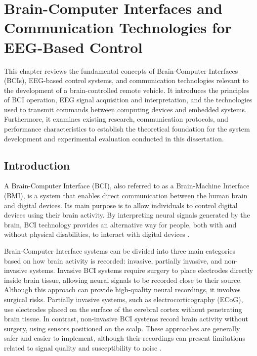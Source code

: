 \section{Brain-Computer Interfaces and Communication Technologies for EEG-Based Control}

This chapter reviews the fundamental concepts of Brain-Computer Interfaces (BCIs), EEG-based control systems, and communication technologies relevant to the development of a brain-controlled remote vehicle. It introduces the principles of BCI operation, EEG signal acquisition and interpretation, and the technologies used to transmit commands between computing devices and embedded systems. Furthermore, it examines existing research, communication protocols, and performance characteristics to establish the theoretical foundation for the system development and experimental evaluation conducted in this dissertation.

\subsection{Introduction}

A Brain-Computer Interface (BCI), also referred to as a Brain-Machine Interface (BMI), is a system that enables direct communication between the human brain and digital devices. Its main purpose is to allow individuals to control digital devices using their brain activity. By interpreting neural signals generated by the brain, BCI technology provides an alternative way for people, both with and without physical disabilities, to interact with digital devices \cite{hassanien2015}.

Brain-Computer Interface systems can be divided into three main categories based on how brain activity is recorded: invasive, partially invasive, and non-invasive systems. Invasive BCI systems require surgery to place electrodes directly inside brain tissue, allowing neural signals to be recorded close to their source. Although this approach can provide high-quality neural recordings, it involves surgical risks. Partially invasive systems, such as electrocorticography (ECoG), use electrodes placed on the surface of the cerebral cortex without penetrating brain tissue. In contrast, non-invasive BCI systems record brain activity without surgery, using sensors positioned on the scalp. These approaches are generally safer and easier to implement, although their recordings can present limitations related to signal quality and susceptibility to noise \cite{hassanien2015}.

